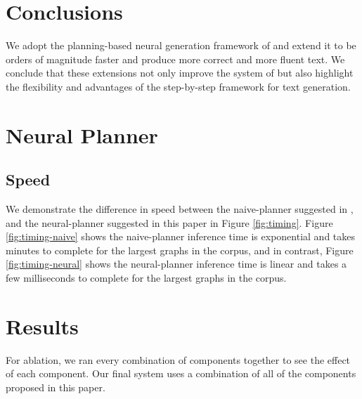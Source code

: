 \section{Conclusions}
We adopt the planning-based neural generation framework of \citet{step-by-step} and extend it to be orders of magnitude faster and produce more correct and more fluent text. We conclude that these extensions not only improve the system of \citet{step-by-step} but also highlight the flexibility and advantages of the step-by-step framework for text generation. 

\clearpage



\clearpage
\appendix

\section{Neural Planner}
% 

\subsection{Speed}
We demonstrate the difference in speed between the naive-planner suggested in \citet{step-by-step}, and the neural-planner suggested in this paper in Figure \ref{fig:timing}. Figure \ref{fig:timing-naive} shows the naive-planner inference time is exponential and takes minutes to complete for the largest graphs in the corpus, and in contrast, Figure \ref{fig:timing-neural} shows the neural-planner inference time is linear and takes a few milliseconds to complete for the largest graphs in the corpus.



\section{Results}
For ablation, we ran every combination of components together to see the effect of each component. Our final system uses a combination of all of the components proposed in this paper.



